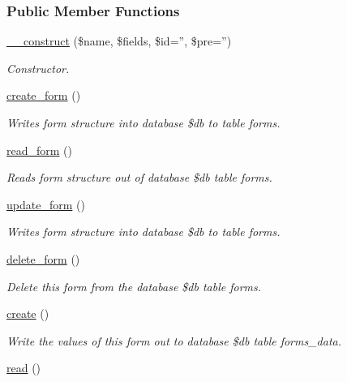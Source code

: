 \subsubsection*{Public Member Functions}
\begin{DoxyCompactItemize}
\item 
\hyperlink{classdatabase__form_acb8c232d66d7b129168622c5d76b777f}{\-\_\-\-\_\-construct} (\$name, \$fields, \$id='', \$pre='')
\begin{DoxyCompactList}\small\item\em Constructor. \end{DoxyCompactList}\item 
\hyperlink{classdatabase__form_a1d3ac5bd74951304e9be88700ac0dcda}{create\-\_\-form} ()
\begin{DoxyCompactList}\small\item\em Writes form structure into database \$db to table forms. \end{DoxyCompactList}\item 
\hyperlink{classdatabase__form_adb7962f1e12276e5d5d35d9bb43db0d6}{read\-\_\-form} ()
\begin{DoxyCompactList}\small\item\em Reads form structure out of database \$db table forms. \end{DoxyCompactList}\item 
\hyperlink{classdatabase__form_aae32575f2c15be7e82d574b01488292f}{update\-\_\-form} ()
\begin{DoxyCompactList}\small\item\em Writes form structure into database \$db to table forms. \end{DoxyCompactList}\item 
\hyperlink{classdatabase__form_a34c12094e361bdb922a5131a55826d28}{delete\-\_\-form} ()
\begin{DoxyCompactList}\small\item\em Delete this form from the database \$db table forms. \end{DoxyCompactList}\item 
\hyperlink{classdatabase__form_a2f217d182a55038d501b66f2a2d51abc}{create} ()
\begin{DoxyCompactList}\small\item\em Write the values of this form out to database \$db table forms\-\_\-data. \end{DoxyCompactList}\item 
\hyperlink{classdatabase__form_aff5e2b2b523b84443a34bc37472d5c8a}{read} ()

\end{DoxyCompactItemize}
